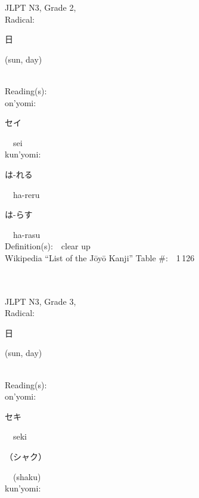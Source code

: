 \begin{multicols}{2}
{JLPT N3, Grade 2, \\Radical:\ \ {\begin{CJK}{UTF8}{min} 日 \end{CJK}} (sun, day) } \\
Reading(s):\ \ \\
{\hspace*{1em}}on'yomi:\ \ \\
{\hspace*{2em}}{\begin{CJK}{UTF8}{min} セイ \end{CJK}}\ \ sei\ \ \\
{\hspace*{1em}}kun'yomi:\ \ \\
{\hspace*{2em}}{\begin{CJK}{UTF8}{min} は-れる \end{CJK}}\ \ ha-reru\ \ \\
{\hspace*{2em}}{\begin{CJK}{UTF8}{min} は-らす \end{CJK}}\ \ ha-rasu\ \ \\
Definition(s):\ \ clear up \\
Wikipedia ``List of the J\=oy\=o Kanji'' Table \#:\ \ 1\,126 \\
\ \ \\
{\fontsize{34pt}{40pt}  }\ \ \\  %
{JLPT N3, Grade 3, \\Radical:\ \ {\begin{CJK}{UTF8}{min} 日 \end{CJK}} (sun, day) } \\
Reading(s):\ \ \\
{\hspace*{1em}}on'yomi:\ \ \\
{\hspace*{2em}}{\begin{CJK}{UTF8}{min} セキ \end{CJK}}\ \ seki\ \ \\
{\hspace*{2em}}{\begin{CJK}{UTF8}{min} （シャク） \end{CJK}}\ \ (shaku)\ \ \\
{\hspace*{1em}}kun'yomi:\ \ \\

\end{multicols}
